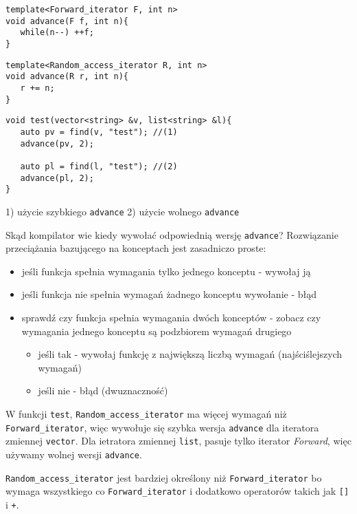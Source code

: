 \documentclass[11pt, a4paper]{article}
\begin{document}
\begin{lstlisting}[frame=single]
template<Forward_iterator F, int n> 
void advance(F f, int n){
   while(n--) ++f;
}
\end{lstlisting}

\begin{lstlisting}[frame=single]
template<Random_access_iterator R, int n> 
void advance(R r, int n){
   r += n;
}
\end{lstlisting}

\begin{lstlisting}[frame=single]
void test(vector<string> &v, list<string> &l){
   auto pv = find(v, "test"); //(1)
   advance(pv, 2);
   
   auto pl = find(l, "test"); //(2)
   advance(pl, 2);
}
\end{lstlisting}

1) użycie szybkiego \verb#advance#
2) użycie wolnego \verb#advance#\newline

Skąd kompilator wie kiedy wywołać odpowiednią wersję \verb#advance#? Rozwiązanie przeciążania bazującego na konceptach jest zasadniczo proste:

\begin{itemize}
\item jeśli funkcja spełnia wymagania tylko jednego konceptu - wywołaj ją
\item jeśli funkcja nie spełnia wymagań żadnego konceptu wywołanie - błąd
\item sprawdź czy funkcja spełnia wymagania dwóch konceptów - zobacz czy wymagania jednego
konceptu są podzbiorem wymagań drugiego
\begin{itemize}
\item jeśli tak - wywołaj funkcję z największą liczbą wymagań (najściślejszych wymagań)
\item jeśli nie - błąd (dwuznaczność)
\end{itemize}
\end{itemize}

W funkcji \verb#test#, \verb#Random_access_iterator# ma więcej wymagań niż \newline \verb#Forward_iterator#, więc wywołuje się szybka wersja \verb#advance# dla iteratora zmiennej \verb#vector#. Dla ietratora zmiennej \verb#list#, pasuje tylko iterator \emph{Forward}, więc używamy wolnej wersji \verb#advance#.

\verb#Random_access_iterator# jest bardziej określony niż \verb#Forward_iterator# bo wymaga wszystkiego co 
\verb#Forward_iterator# i dodatkowo operatorów takich jak \verb#[]# i \verb#+#.
\end{document}
